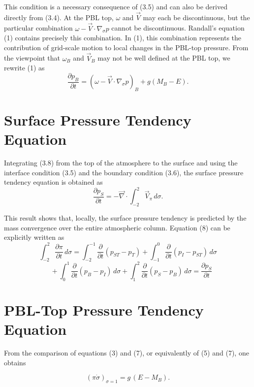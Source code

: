 \documentclass[12pt,openany]{book}
\begin{document}
This condition is a necessary consequence of (3.5) and can also be derived directly from (3.4).
At the PBL top, $\omega$ and $\vec{V}$ may each be discontinuous, but the particular combination
$\omega - \vec{V} \cdot \nabla_{\sigma} p$
cannot be discontinuous.
Randall's equation (1) contains precisely this combination.
In (1), this combination represents the contribution of grid-scale motion to local changes in the PBL-top pressure.
From the viewpoint that $\omega_B$ and $\vec{V}_B$ may not be well defined at the PBL top,
we rewrite (1) as
\begin{equation}
\frac{\partial p_B}{\partial t}
=
\left(
\omega
-
\vec{V} \cdot \nabla_{\sigma} p
\right)_B
+
g (M_B - E) .
\tag{4.7}\label{eq:4.7}
\end{equation}

\section{Surface Pressure Tendency Equation}

Integrating (3.8) from the top of the atmosphere to the surface and using the interface condition (3.5) and the boundary condition (3.6), the surface pressure tendency equation is obtained as
\begin{equation}
\frac{\partial p_S}{\partial t}
=
- \vec{\nabla} \cdot \int_{-2}^{2} \vec{V}_{\pi} \, d\sigma .
\tag{4.8}
\label{eq:4.8}
\end{equation}

This result shows that, locally, the surface pressure tendency is predicted by the mass convergence over the entire atmospheric column. Equation (8) can be explicitly written as
\[
\int_{-2}^{2} \frac{\partial \pi}{\partial t} \, d\sigma
=
\int_{-2}^{-1} \frac{\partial}{\partial t}(p_{ST} - p_T)
+
\int_{-1}^{0} \frac{\partial}{\partial t}(p_I - p_{ST}) \, d\sigma
\]
\[
\quad
+
\int_{0}^{1} \frac{\partial}{\partial t}(p_B - p_I) \, d\sigma
+
\int_{1}^{2} \frac{\partial}{\partial t}(p_S - p_B) \, d\sigma
=
\frac{\partial p_S}{\partial t}
\]

\section{PBL-Top Pressure Tendency Equation}

From the comparison of equations (3) and (7), or equivalently of (5) and (7), one obtains

\begin{equation}
(\pi \dot{\sigma})_{\sigma=1}
=
g\,(E - M_B).
\tag{4.9}
\label{eq:4.9}
\end{equation}
\end{document}
